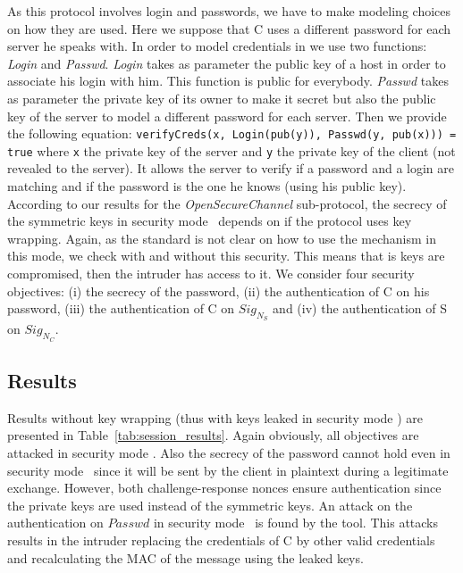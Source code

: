 As this protocol involves login and passwords, we have to make
modeling choices on how they are used.  Here we suppose that C uses a
different password for each server he speaks with.  In order to model
credentials in \proverif we use two functions: {\em Login} and {\em
  Passwd}.  {\em Login} takes as parameter the public key of a host in
order to associate his login with him. This function is public for
everybody.  {\em Passwd} takes as parameter the private key of its
owner to make it secret but also the public key of the server to model
a different password for each server.  Then we provide the following
equation: \texttt{verifyCreds(x, Login(pub(y)), Passwd(y, pub(x))) =
  true} where \texttt{x} the private key of the server and \texttt{y}
the private key of the client (not revealed to the server).  It allows
the server to verify if a password and a login are matching and if the
password is the one he knows (using his public key).
According to our results for the {\em OpenSecureChannel} sub-protocol, the
secrecy of the symmetric keys in security mode \sms~depends on if the protocol
uses key wrapping.
Again, as the \opcua standard is not clear on how to use the mechanism in
this mode, we check with and without this security.
This means that is keys are compromised, then the intruder has access to it.
We consider four security objectives: (i) the secrecy of the
password, (ii) the authentication of C on his password, (iii) the
authentication of C on $Sig_{N_{S}}$ and (iv) the authentication of S on
$Sig_{N_{C}}$.

\subsection{Results}

Results without key wrapping (thus with keys leaked in security mode \sms) are
presented in Table~\ref{tab:session_results}.
Again obviously, all objectives are attacked in security mode \smn.
Also the secrecy of the password cannot hold even in security mode \sms~since
it will be sent by the client in plaintext during a legitimate exchange.
However, both challenge-response nonces ensure authentication since the private
keys are used instead of the symmetric keys.
An attack on the authentication on $Passwd$ in security mode \sms~is found by
the tool.
This attacks results in the intruder replacing the credentials of C by other
valid credentials and recalculating the MAC of the message using the leaked keys.

